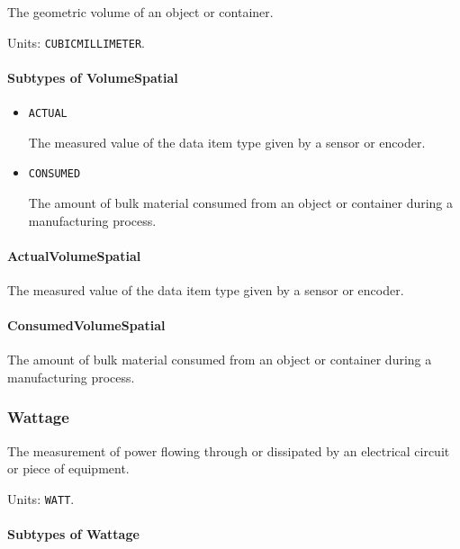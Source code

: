 The geometric volume of an object or container.


Units: \texttt{CUBIC\textunderscore MILLIMETER}.

\paragraph{Subtypes of VolumeSpatial}\mbox{}
\label{sec:Subtypes of VolumeSpatial}

\begin{itemize}

\item \texttt{ACTUAL}


The measured value of the data item type given by a sensor or encoder.

\item \texttt{CONSUMED}


The amount of bulk material consumed from an object or container during a manufacturing process.


\end{itemize}

\paragraph{ActualVolumeSpatial}\mbox{}
\label{sec:ActualVolumeSpatial}


The measured value of the data item type given by a sensor or encoder.


\paragraph{ConsumedVolumeSpatial}\mbox{}
\label{sec:ConsumedVolumeSpatial}


The amount of bulk material consumed from an object or container during a manufacturing process.


\subsubsection{Wattage}
\label{sec:Wattage}



The measurement of power flowing through or dissipated by an electrical circuit or piece of equipment.


Units: \texttt{WATT}.

\paragraph{Subtypes of Wattage}\mbox{}
\label{sec:Subtypes of Wattage}

